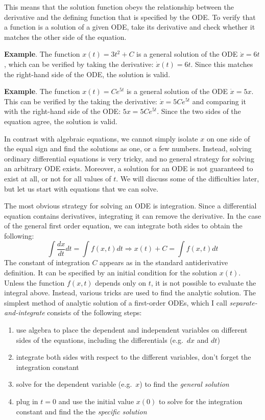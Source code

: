 \documentclass[
  letterpaper,
  DIV=11,
  numbers=noendperiod]{scrreprt}
\providecommand{\tightlist}{%
  \setlength{\itemsep}{0pt}\setlength{\parskip}{0pt}}\usepackage{longtable,booktabs,array}
\begin{document}
This means that the solution function obeys the relationship between the
derivative and the defining function that is specified by the ODE. To
verify that a function is a solution of a given ODE, take its derivative
and check whether it matches the other side of the equation.

\textbf{Example}. The function \(x(t) = 3t^2 +C\) is a general solution
of the ODE \(\dot x = 6t\), which can be verified by taking the
derivative: \(\dot x (t) = 6t\). Since this matches the right-hand side
of the ODE, the solution is valid.

\textbf{Example}. The function \(x(t) = Ce^{5t}\) is a general solution
of the ODE \(\dot x = 5x\). This can be verified by the taking the
derivative: \(\dot x = 5C e^{5t}\) and comparing it with the right-hand
side of the ODE: \(5x = 5 Ce^{5t}\). Since the two sides of the equation
agree, the solution is valid.

In contrast with algebraic equations, we cannot simply isolate \(x\) on
one side of the equal sign and find the solutions as one, or a few
numbers. Instead, solving ordinary differential equations is very
tricky, and no general strategy for solving an arbitrary ODE exists.
Moreover, a solution for an ODE is not guaranteed to exist at all, or
not for all values of \(t\). We will discuss some of the difficulties
later, but let us start with equations that we can solve.

The most obvious strategy for solving an ODE is integration. Since a
differential equation contains derivatives, integrating it can remove
the derivative. In the case of the general first order equation, we can
integrate both sides to obtain the following:
\[ \int \frac{dx}{dt} dt = \int f(x,t) dt \Rightarrow x(t) + C = \int f(x,t) dt\]
The constant of integration \(C\) appears as in the standard
antiderivative definition. It can be specified by an initial condition
for the solution \(x(t)\). Unless the function \(f(x,t)\) depends only
on \(t\), it is not possible to evaluate the integral above. Instead,
various tricks are used to find the analytic solution. The simplest
method of analytic solution of a first-order ODEs, which I call
\emph{separate-and-integrate} consists of the following steps:

\begin{enumerate}
\def\labelenumi{\arabic{enumi}.}
\tightlist
\item
  use algebra to place the dependent and independent variables on
  different sides of the equations, including the differentials
  (e.g.~\(dx\) and \(dt\))
\item
  integrate both sides with respect to the different variables, don't
  forget the integration constant
\item
  solve for the dependent variable (e.g.~\(x\)) to find the
  \emph{general solution}
\item
  plug in \(t=0\) and use the initial value \(x(0)\) to solve for the
  integration constant and find the the \emph{specific solution}
\end{enumerate}
\end{document}
